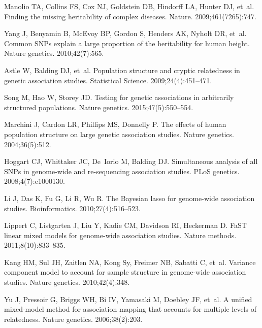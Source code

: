 \documentclass[10pt,letterpaper]{article}
\begin{document}
\begin{thebibliography}{10}
	
	Manolio TA, Collins FS, Cox NJ, Goldstein DB, Hindorff LA, Hunter DJ, et~al.
	\newblock Finding the missing heritability of complex diseases.
	\newblock Nature. 2009;461(7265):747.
	
	Yang J, Benyamin B, McEvoy BP, Gordon S, Henders AK, Nyholt DR, et~al.
	\newblock Common SNPs explain a large proportion of the heritability for human
	height.
	\newblock Nature genetics. 2010;42(7):565.
	
	Astle W, Balding DJ, et~al.
	\newblock Population structure and cryptic relatedness in genetic association
	studies.
	\newblock Statistical Science. 2009;24(4):451--471.
	
	Song M, Hao W, Storey JD.
	\newblock Testing for genetic associations in arbitrarily structured
	populations.
	\newblock Nature genetics. 2015;47(5):550--554.
	
	Marchini J, Cardon LR, Phillips MS, Donnelly P.
	\newblock The effects of human population structure on large genetic
	association studies.
	\newblock Nature genetics. 2004;36(5):512.
	
	Hoggart CJ, Whittaker JC, De~Iorio M, Balding DJ.
	\newblock Simultaneous analysis of all SNPs in genome-wide and re-sequencing
	association studies.
	\newblock PLoS genetics. 2008;4(7):e1000130.
	
	Li J, Das K, Fu G, Li R, Wu R.
	\newblock The Bayesian lasso for genome-wide association studies.
	\newblock Bioinformatics. 2010;27(4):516--523.
	
	Lippert C, Listgarten J, Liu Y, Kadie CM, Davidson RI, Heckerman D.
	\newblock FaST linear mixed models for genome-wide association studies.
	\newblock Nature methods. 2011;8(10):833--835.
	
	Kang HM, Sul JH, Zaitlen NA, Kong Sy, Freimer NB, Sabatti C, et~al.
	\newblock Variance component model to account for sample structure in
	genome-wide association studies.
	\newblock Nature genetics. 2010;42(4):348.
	
	Yu J, Pressoir G, Briggs WH, Bi IV, Yamasaki M, Doebley JF, et~al.
	\newblock A unified mixed-model method for association mapping that accounts
	for multiple levels of relatedness.
	\newblock Nature genetics. 2006;38(2):203.
	

\end{thebibliography}
\end{document}
